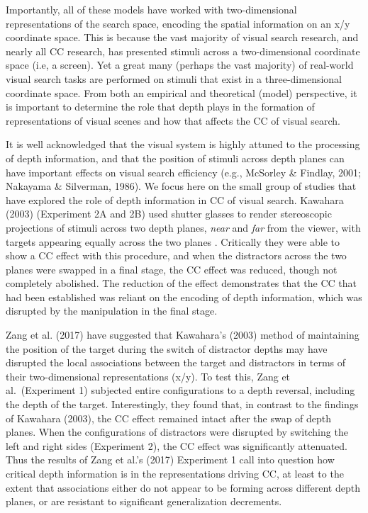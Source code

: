 \documentclass[
  english,
  man,floatsintext]{apa7}
\begin{document}
Importantly, all of these models have worked with two-dimensional representations of the search space, encoding the spatial information on an x/y coordinate space. This is because the vast majority of visual search research, and nearly all CC research, has presented stimuli across a two-dimensional coordinate space (i.e, a screen). Yet a great many (perhaps the vast majority) of real-world visual search tasks are performed on stimuli that exist in a three-dimensional coordinate space. From both an empirical and theoretical (model) perspective, it is important to determine the role that depth plays in the formation of representations of visual scenes and how that affects the CC of visual search.

It is well acknowledged that the visual system is highly attuned to the processing of depth information, and that the position of stimuli across depth planes can have important effects on visual search efficiency (e.g., McSorley \& Findlay, 2001; Nakayama \& Silverman, 1986). We focus here on the small group of studies that have explored the role of depth information in CC of visual search. Kawahara (2003) (Experiment 2A and 2B) used shutter glasses to render stereoscopic projections of stimuli across two depth planes, \emph{near} and \emph{far} from the viewer, with targets appearing equally across the two planes . Critically they were able to show a CC effect with this procedure, and when the distractors across the two planes were swapped in a final stage, the CC effect was reduced, though not completely abolished. The reduction of the effect demonstrates that the CC that had been established was reliant on the encoding of depth information, which was disrupted by the manipulation in the final stage.

Zang et al. (2017) have suggested that Kawahara's (2003) method of maintaining the position of the target during the switch of distractor depths may have disrupted the local associations between the target and distractors in terms of their two-dimensional representations (x/y). To test this, Zang et al.~(Experiment 1) subjected entire configurations to a depth reversal, including the depth of the target. Interestingly, they found that, in contrast to the findings of Kawahara (2003), the CC effect remained intact after the swap of depth planes. When the configurations of distractors were disrupted by switching the left and right sides (Experiment 2), the CC effect was significantly attenuated. Thus the results of Zang et al.'s (2017) Experiment 1 call into question how critical depth information is in the representations driving CC, at least to the extent that associations either do not appear to be forming across different depth planes, or are resistant to significant generalization decrements.
\end{document}
